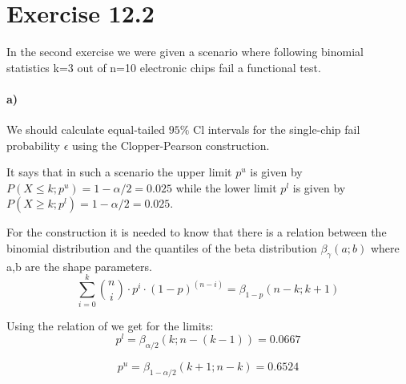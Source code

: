 \documentclass[10pt]{article}
\newenvironment{myfont}{\fontfamily{put}\selectfont}{\par}
\begin{document}
\begin{myfont}
\section*{Exercise 12.2}

In the second exercise we were given a scenario where following binomial statistics k=3 out of n=10 electronic chips fail a functional test.

\paragraph{a)} We should calculate equal-tailed $95\%$ Cl intervals for the single-chip fail probability $\epsilon$ using the Clopper-Pearson construction.

It says that in such a scenario the upper limit $p^{u}$ is given by $P(X \leq k;p^{u}) = 1-\alpha /2 = 0.025$ while the lower limit $p^{l}$ is given by $P(X \geq k;p^{l}) = 1-\alpha /2 = 0.025$.

For the construction it is needed to know that  
there is a relation between the binomial distribution and the quantiles of the beta distribution $\beta_{\gamma}(a;b)$ where a,b are the shape parameters.
\begin{equation}
    \sum^k_{i=0} \binom{n}{i} \cdot p^i \cdot (1-p)^{(n-i)} = \beta_{1-p}(n-k;k+1)
\end{equation}

Using the relation of  we get for the limits:
\begin{equation}
    p^{l} = \beta_{\alpha/2}(k;n-(k-1)) = 0.0667 
\end{equation}

\begin{equation}
    p^{u} = \beta_{1-\alpha/2}(k+1;n-k) = 0.6524 
\end{equation}
\end{myfont}
\end{document}
